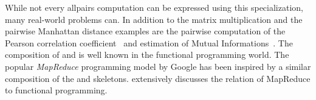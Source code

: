 While not every allpairs computation can be expressed using this specialization, many real-world problems can.
In addition to the matrix multiplication and the pairwise Manhattan distance examples are the pairwise computation of the Pearson correlation coefficient~\cite{ChangDeQuRo2009} and estimation of Mutual Informations~\cite{DaubStSeKl2004}.
The composition of \zip and \reduce is well known in the functional programming world.
The popular \emph{MapReduce} programming model by Google has been inspired by a similar composition of the \map and \reduce skeletons.
\cite{Laemmel2007} extensively discusses the relation of MapReduce to functional programming.


% 
